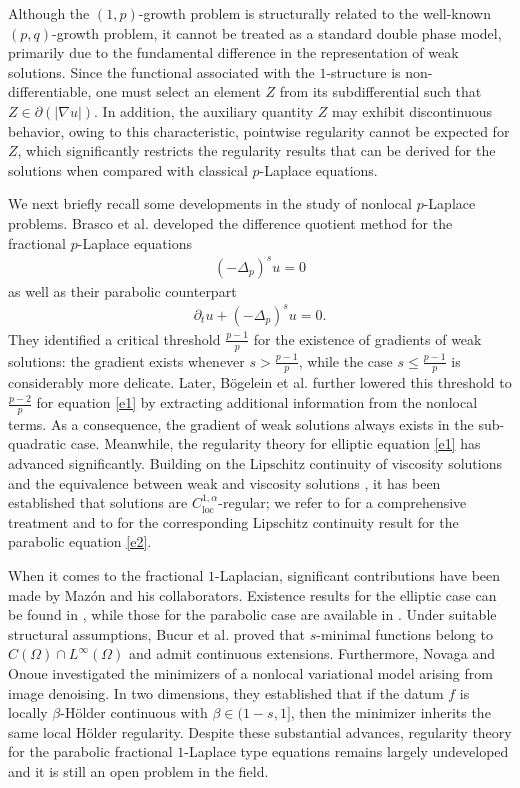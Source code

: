 \documentclass[reqno,10pt]{amsart}
\numberwithin{equation}{section}
\begin{document}
Although the $(1, p)$-growth problem is structurally related to the well-known $(p, q)$-growth problem, it cannot be treated as a standard double phase model, primarily due to the fundamental difference in the representation of weak solutions. Since the functional associated with the $1$-structure is non-differentiable, one must select an element $Z$ from its subdifferential such that $Z\in\partial\left( |\nabla u|\right) $. In addition, the auxiliary quantity $Z$ may exhibit discontinuous behavior, owing to this characteristic, pointwise regularity cannot be expected for $Z$, which significantly restricts the regularity results that can be derived for the solutions when compared with classical $p$-Laplace equations.

We next briefly recall some developments in the study of nonlocal $p$-Laplace problems. Brasco et al. \cite{BL17,BLS18} developed the difference quotient method for the fractional $p$-Laplace equations
\begin{align}
	\label{e1}
	(-\Delta_p)^s u=0
\end{align}
as well as their parabolic counterpart \cite{BLS21}
\begin{align}
	\label{e2}
	\partial_tu+(-\Delta_p)^s u=0.
\end{align}
They identified a  critical  threshold $\frac{p-1}{p}$ for the existence of gradients of weak solutions: the gradient exists whenever $s>\frac{p-1}{p}$, while  the case $s\le\frac{p-1}{p}$ is considerably more delicate. Later, B\"{o}gelein et al. \cite{BDL2401, BDL2402} further lowered this threshold to $\frac{p-2}{p}$ for equation \eqref{e1} by extracting additional information from the nonlocal terms. As a consequence, the gradient of weak solutions always exists in the sub-quadratic case. Meanwhile, the regularity theory for elliptic equation \eqref{e1} has advanced significantly. Building on the Lipschitz continuity of viscosity solutions \cite{BT25} and the equivalence between weak and viscosity solutions \cite{KKL19}, it has been established that solutions are $C^{1, \alpha}_{\mathrm{loc}}$-regular; we refer to \cite{GJS25} for a comprehensive treatment and to \cite{JSU26} for the corresponding Lipschitz continuity result for the parabolic equation \eqref{e2}.

When it comes to the fractional $1$-Laplacian, significant contributions have been made by Maz\'{o}n and his collaborators. Existence results for the elliptic case can be found in \cite{B23, BDLM23, MPRT16, MRT19}, while those for the parabolic case are available in \cite{AMRT08, AMRT09, MRT16}. Under suitable structural assumptions, Bucur et al. \cite{BDLV25} proved that $s$-minimal functions belong to $C(\Omega)\cap L^\infty(\Omega)$ and admit continuous extensions.
Furthermore, Novaga and Onoue \cite{NO23} investigated the minimizers of a nonlocal variational model arising from image denoising. In two dimensions, they established that if the datum $f$ is locally $\beta$-H\"{o}lder continuous with $\beta\in(1-s, 1]$, then the minimizer inherits the same local H\"{o}lder regularity. Despite these substantial advances, regularity theory for the parabolic fractional $1$-Laplace type equations remains largely undeveloped and it is still  an open problem in the field.
\end{document}
